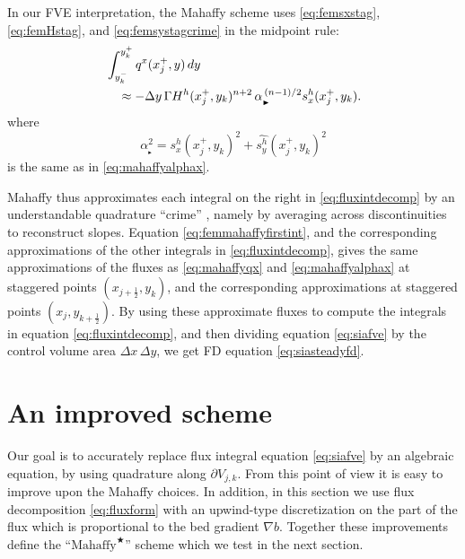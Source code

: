 \documentclass[twocolumn,letterpaper]{igs}
\newcommand{\grad}{\nabla}
\newcommand{\Mstar}{$\text{Mahaffy}^{\bigstar}$\xspace}
\newcommand\alpharight{\alpha_{{}_{\blacktriangleright}}}
\newcommand{\half}{\tfrac{1}{2}}
\begin{document}
In our FVE interpretation, the Mahaffy scheme uses \eqref{eq:femsxstag}, \eqref{eq:femHstag}, and \eqref{eq:femsystagcrime} in the midpoint rule:
\begin{align}
&\int_{y_k^-}^{y_k^+} q^x(x_j^+,y)\,dy  \label{eq:femmahaffyfirstint} \\
  &\quad\approx - \Delta y\, \Gamma H^h(x_j^+,y_k)^{n+2} \,\alpharight^{\,(n-1)/2} s^h_x(x_j^+,y_k). \notag 
\end{align}
where
\begin{equation}
\alpharight^2 = s^h_x(x_j^+,y_k)^2 + \widehat{s^h_y}(x_j^+,y_k)^2
\end{equation}
is the same as in \eqref{eq:mahaffyalphax}.

Mahaffy thus approximates each integral on the right in \eqref{eq:fluxintdecomp} by an understandable quadrature ``crime'' \citep[compare][]{Strang1972}, namely by averaging across discontinuities to reconstruct slopes.  Equation \eqref{eq:femmahaffyfirstint}, and the corresponding approximations of the other integrals in \eqref{eq:fluxintdecomp}, gives the same approximations of the fluxes as \eqref{eq:mahaffyqx} and \eqref{eq:mahaffyalphax} at staggered points $(x_{j+\half},y_k)$, and the corresponding approximations at staggered points $(x_j,y_{k+\half})$.  By using these approximate fluxes to compute the integrals in equation \eqref{eq:fluxintdecomp}, and then dividing equation \eqref{eq:siafve} by the control volume area $\Delta x\,\Delta y$, we get FD equation \eqref{eq:siasteadyfd}.


\section{An improved scheme}  \label{sec:star}

Our goal is to accurately replace flux integral equation \eqref{eq:siafve} by an algebraic equation, by using quadrature along $\partial V_{j,k}$.  From this point of view it is easy to improve upon the Mahaffy choices.  In addition, in this section we use flux decomposition \eqref{eq:fluxform} with an upwind-type discretization on the part of the flux which is proportional to the bed gradient $\grad b$.  Together these improvements define the ``\Mstar'' scheme which we test in the next section.
\end{document}
